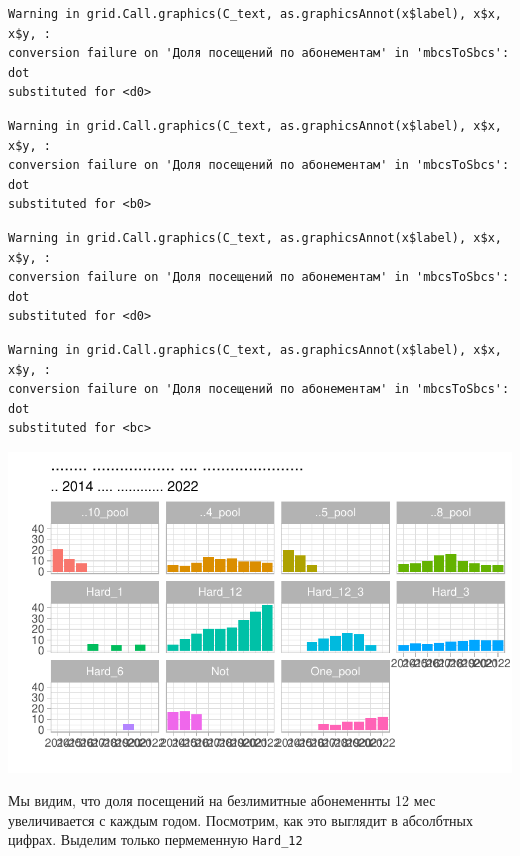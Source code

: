 \documentclass[
  letterpaper,
  DIV=11,
  numbers=noendperiod]{scrartcl}
\begin{document}
\begin{verbatim}
Warning in grid.Call.graphics(C_text, as.graphicsAnnot(x$label), x$x, x$y, :
conversion failure on 'Доля посещений по абонементам' in 'mbcsToSbcs': dot
substituted for <d0>
\end{verbatim}

\begin{verbatim}
Warning in grid.Call.graphics(C_text, as.graphicsAnnot(x$label), x$x, x$y, :
conversion failure on 'Доля посещений по абонементам' in 'mbcsToSbcs': dot
substituted for <b0>
\end{verbatim}

\begin{verbatim}
Warning in grid.Call.graphics(C_text, as.graphicsAnnot(x$label), x$x, x$y, :
conversion failure on 'Доля посещений по абонементам' in 'mbcsToSbcs': dot
substituted for <d0>
\end{verbatim}

\begin{verbatim}
Warning in grid.Call.graphics(C_text, as.graphicsAnnot(x$label), x$x, x$y, :
conversion failure on 'Доля посещений по абонементам' in 'mbcsToSbcs': dot
substituted for <bc>
\end{verbatim}

\includegraphics{./intro_files/figure-pdf/unnamed-chunk-8-1.pdf}

Мы видим, что доля посещений на безлимитные абонеменнты 12 мес
увеличивается с каждым годом. Посмотрим, как это выглядит в абсолбтных
цифрах. Выделим только пермеменную \texttt{Hard\_12}
\end{document}

